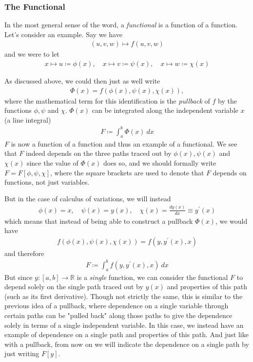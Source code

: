 \documentclass[a4paper]{article}
\begin{document}
    \subsubsection{The Functional}
    In the most general sense of the word, a \textit{functional} is a function of a function. Let's consider an example. Say we have \begin{align*}
        (u, v, w) \mapsto f(u, v, w)
    \end{align*}
    and we were to let \begin{align*}
        x \mapsto u \coloneqq \phi (x),\quad
        x \mapsto v \coloneqq \psi (x),\quad
        x \mapsto w \coloneqq \chi (x)
    \end{align*}

    As discussed above, we could then just as well write \begin{align*}
        \Phi (x) = f(\phi (x), \psi (x), \chi (x)),
    \end{align*}
    where the mathematical term for this identification is the \textit{pullback} of \(f\) by the functions \(\phi, \psi\) and \(\chi\). \(\Phi (x)\) can be integrated along the independent variable \(x\) (a line integral) \begin{align*}
        F \coloneqq \int _a ^b \Phi (x)\ dx
    \end{align*}
    \(F\) is now a function of a function and thus an example of a functional. We see that \(F\) indeed depends on the three paths traced out by \(\phi(x), \psi(x) \) and \(\chi(x)\) since the value of \(\Phi (x)\) does so, and we should formally write \(F = F[\phi, \psi, \chi]\), where the square brackets are used to denote that \(F\) depends on functions, not just variables.
    
    But in the case of calculus of variations, we will instead \begin{align*}
        \phi (x) = x,\quad
        \psi (x) = y(x),\quad
        \chi (x) = \frac{dy(x)}{dx} \equiv y^{\prime}(x)
    \end{align*}
    which means that instead of being able to construct a pullback \(\Phi (x)\), we would have
    \begin{align*}
        f(\phi(x), \psi (x), \chi (x)) = f(y, y^{\prime}(x), x)
    \end{align*}
    and therefore \begin{align*}
        F \coloneqq \int_a ^b f(y, y^{\prime}(x), x)\ dx
    \end{align*}
    But since \(y: [a, b] \to \mathbb{R}\) is a \textit{single} function, we can consider the functional \(F\) to depend solely on the single path traced out by \(y(x)\) and properties of this path (such as its first derivative). Though not strictly the same, this is similar to the previous idea of a pullback, where dependence on a single variable through certain paths can be "pulled back" along those paths to give the dependence solely in terms of a single independent variable. In this case, we instead have an example of dependence on a single path and properties of this path. And just like with a pullback, from now on we will indicate the dependence on a single path by just writing \(F[y]\).
\end{document}
